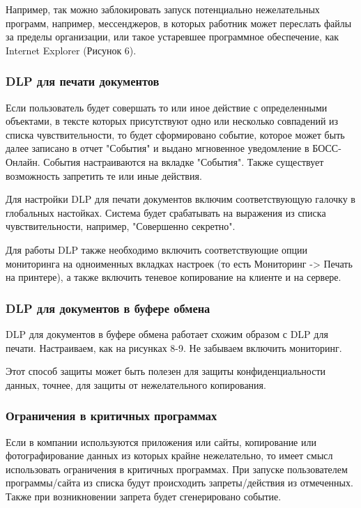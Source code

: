 Например, так можно заблокировать запуск потенциально нежелательных программ, например, мессенджеров, в которых работник может переслать файлы за пределы организации, или такое устаревшее программное обеспечение, как Internet Explorer (Рисунок 6).

\FloatBarrier

\subsubsection{DLP для печати документов}

Если пользователь будет совершать то или иное действие с определенными объектами, в тексте которых присутствуют одно или несколько совпадений из списка чувствительности, то будет сформировано событие, которое может быть далее записано в отчет "События" и выдано мгновенное уведомление в БОСС-Онлайн. События настраиваются на вкладке "События". Также существует возможность запретить те или иные действия.

Для настройки DLP для печати документов включим соответствующую галочку в глобальных настойках. Система будет срабатывать на выражения из списка чувствительности, например, "Совершенно секретно".

Для работы DLP также необходимо включить соответствующие опции мониторинга на одноименных вкладках настроек (то есть Мониторинг -> Печать на принтере), а также включить теневое копирование на клиенте и на сервере.

\FloatBarrier


\subsubsection{DLP для документов в буфере обмена}
DLP для документов в буфере обмена работает схожим образом с DLP для печати. Настраиваем, как на рисунках 8-9. Не забываем включить мониторинг.

Этот способ защиты может быть полезен для защиты конфиденциальности данных, точнее, для защиты от нежелательного копирования.

\FloatBarrier


\subsubsection{Ограничения в критичных программах}
Если в компании используются приложения или сайты, копирование или фотографирование данных из которых крайне нежелательно, то имеет смысл использовать ограничения в критичных программах. При запуске пользователем программы/сайта из списка будут происходить запреты/действия из отмеченных. Также при возникновении запрета будет сгенерировано событие. 

